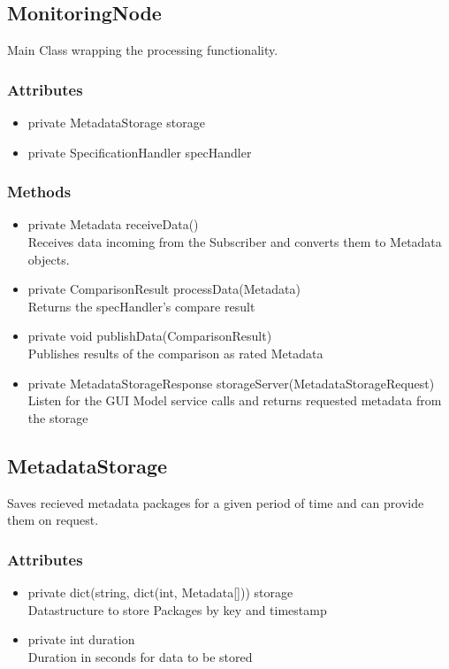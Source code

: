 
\subsection{MonitoringNode}
Main Class wrapping the processing functionality.

\subsubsection{Attributes}
\begin{itemize}
	\item private  MetadataStorage storage
	\item private  SpecificationHandler specHandler
\end{itemize}
\subsubsection{Methods}
\begin{itemize}
	\item private  Metadata receiveData()\\
	Receives data incoming from the Subscriber and converts them to Metadata objects.
	\item private  ComparisonResult processData(Metadata)\\
	Returns the specHandler's compare result
	\item private  void publishData(ComparisonResult)\\
	Publishes results of the comparison as rated Metadata
	\item private  MetadataStorageResponse storageServer(MetadataStorageRequest)\\
	Listen for the GUI Model service calls and returns requested metadata from the storage
\end{itemize}


\subsection{MetadataStorage}
Saves recieved metadata packages for a given period of time and can provide them on request.

\subsubsection{Attributes}
\begin{itemize}
	\item private  dict(string, dict(int, Metadata[])) storage\\
	Datastructure to store Packages by key and timestamp
	\item private  int duration\\
	Duration in seconds for data to be stored
\end{itemize}
